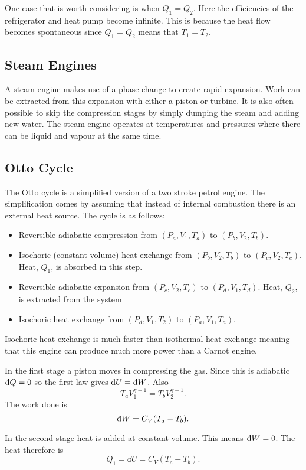    One case that is worth considering is when \(Q_1 = Q_2\).
    Here the efficiencies of the refrigerator and heat pump become infinite.
    This is because the heat flow becomes spontaneous since \(Q_1 = Q_2\) means that \(T_1 = T_2\).
    
    \subsection{Steam Engines}
    A steam engine makes use of a phase change to create rapid expansion.
    Work can be extracted from this expansion with either a piston or turbine.
    It is also often possible to skip the compression stages by simply dumping the steam and adding new water.
    The steam engine operates at temperatures and pressures where there can be liquid and vapour at the same time.
    
    \subsection{Otto Cycle}
    The Otto cycle is a simplified version of a two stroke petrol engine.
    The simplification comes by assuming that instead of internal combustion there is an external heat source.
    The cycle is as follows:
    \begin{itemize}
        \item Reversible adiabatic compression from \((P_a, V_1, T_a)\) to \((P_b, V_2, T_b)\).
        \item Isochoric (constant volume) heat exchange from \((P_b, V_2, T_b)\) to \((P_c, V_2, T_c)\).
        Heat, \(Q_1\), is absorbed in this step.
        \item Reversible adiabatic expansion from \((P_c, V_2, T_c)\) to \((P_d, V_1, T_d)\).
        Heat, \(Q_2\), is extracted from the system
        \item Isochoric heat exchange from \((P_d, V_1, T_2)\) to \((P_a, V_1, T_a)\).
    \end{itemize}
    Isochoric heat exchange is much faster than isothermal heat exchange meaning that this engine can produce much more power than a Carnot engine.
    
    In the first stage a piston moves in compressing the gas.
    Since this is adiabatic \(\ddbar{Q} = 0\) so the first law gives \(\dd{U} = \ddbar{W}\).
    Also
    \[T_aV_1^{\gamma-1} = T_bV_2^{\gamma-1}.\]
    The work done is
    \[\ddbar{W} = C_V(T_a - T_b).\]
    
    In the second stage heat is added at constant volume.
    This means \(\ddbar{W} = 0\).
    The heat therefore is
    \[Q_1 = \dd{U} = C_V(T_c - T_b).\]
    
